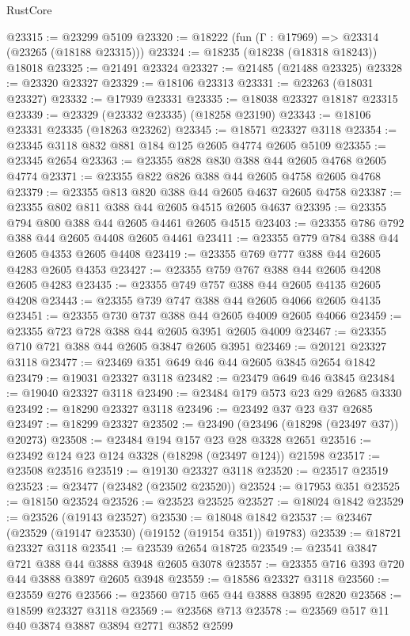\begin{lexlean}{RustCore}
\begin{coremodule}
@23315 := @23299 @5109
@23320 := @18222 (fun (Γ : @17969) => @23314 (@23265 (@18188 @23315)))
@23324 := @18235 (@18238 (@18318 @18243)) @18018
@23325 := @21491 @23324
@23327 := @21485 (@21488 @23325)
@23328 := @23320 @23327
@23329 := @18106 @23313
@23331 := @23263 (@18031 @23327)
@23332 := @17939 @23331
@23335 := @18038 @23327 @18187 @23315
@23339 := @23329 (@23332 @23335) (@18258 @23190)
@23343 := @18106 @23331 @23335 (@18263 @23262)
@23345 := @18571 @23327 @3118
@23354 := @23345 @3118 @832 @881 @184 @125 @2605 @4774 @2605 @5109
@23355 := @23345 @2654
@23363 := @23355 @828 @830 @388 @44 @2605 @4768 @2605 @4774
@23371 := @23355 @822 @826 @388 @44 @2605 @4758 @2605 @4768
@23379 := @23355 @813 @820 @388 @44 @2605 @4637 @2605 @4758
@23387 := @23355 @802 @811 @388 @44 @2605 @4515 @2605 @4637
@23395 := @23355 @794 @800 @388 @44 @2605 @4461 @2605 @4515
@23403 := @23355 @786 @792 @388 @44 @2605 @4408 @2605 @4461
@23411 := @23355 @779 @784 @388 @44 @2605 @4353 @2605 @4408
@23419 := @23355 @769 @777 @388 @44 @2605 @4283 @2605 @4353
@23427 := @23355 @759 @767 @388 @44 @2605 @4208 @2605 @4283
@23435 := @23355 @749 @757 @388 @44 @2605 @4135 @2605 @4208
@23443 := @23355 @739 @747 @388 @44 @2605 @4066 @2605 @4135
@23451 := @23355 @730 @737 @388 @44 @2605 @4009 @2605 @4066
@23459 := @23355 @723 @728 @388 @44 @2605 @3951 @2605 @4009
@23467 := @23355 @710 @721 @388 @44 @2605 @3847 @2605 @3951
@23469 := @20121 @23327 @3118
@23477 := @23469 @351 @649 @46 @44 @2605 @3845 @2654 @1842
@23479 := @19031 @23327 @3118
@23482 := @23479 @649 @46 @3845
@23484 := @19040 @23327 @3118
@23490 := @23484 @179 @573 @23 @29 @2685 @3330
@23492 := @18290 @23327 @3118
@23496 := @23492 @37 @23 @37 @2685
@23497 := @18299 @23327
@23502 := @23490 (@23496 (@18298 (@23497 @37)) @20273)
@23508 := @23484 @194 @157 @23 @28 @3328 @2651
@23516 := @23492 @124 @23 @124 @3328 (@18298 (@23497 @124)) @21598
@23517 := @23508 @23516
@23519 := @19130 @23327 @3118
@23520 := @23517 @23519
@23523 := @23477 (@23482 (@23502 @23520))
@23524 := @17953 @351
@23525 := @18150 @23524
@23526 := @23523 @23525
@23527 := @18024 @1842
@23529 := @23526 (@19143 @23527)
@23530 := @18048 @1842
@23537 := @23467 (@23529 (@19147 @23530) (@19152 (@19154 @351)) @19783)
@23539 := @18721 @23327 @3118
@23541 := @23539 @2654 @18725
@23549 := @23541 @3847 @721 @388 @44 @3888 @3948 @2605 @3078
@23557 := @23355 @716 @393 @720 @44 @3888 @3897 @2605 @3948
@23559 := @18586 @23327 @3118
@23560 := @23559 @276
@23566 := @23560 @715 @65 @44 @3888 @3895 @2820
@23568 := @18599 @23327 @3118
@23569 := @23568 @713
@23578 := @23569 @517 @11 @40 @3874 @3887 @3894 @2771 @3852 @2599

\end{coremodule}
\end{lexlean}
